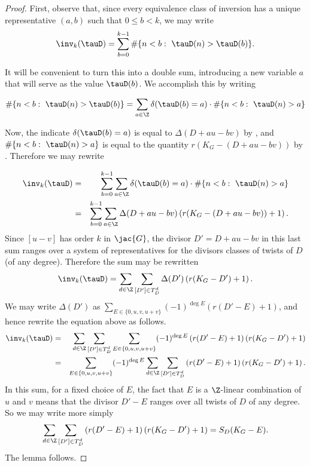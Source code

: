 \begin{proof}
First, observe that, since every equivalence class of inversion has a unique representative $(a,b)$ such that $0 \leq b < k$,  we may write
$$
\inv_k(\tauD)
=
\sum_{b=0}^{k-1} \# \{ n < b:\ \tauD(n) > \tauD(b) \}.
$$

It will be convenient to turn this into a double sum, introducing a new variable $a$ that will serve as the value $\tauD(b)$. We accomplish this by writing

\[ \# \{ n < b:\ \tauD(n) > \tauD(b) \} 
= \sum_{a \in \Z} \delta(\tauD(b) = a) \cdot \# \{n < b:\ \tauD(n) > a\}
\]

Now, the indicate $\delta(\tauD(b) = a)$ is equal to $\Delta( D + au-bv)$ by , and $\# \{n < b:\ \tauD(n) > a\}$ is equal to the quantity $r(K_G - (D+au-bv))$ by . Therefore we may rewrite

\begin{eqnarray*}
\inv_k(\tauD) &=&
\sum_{b=0}^{k-1} \sum_{a \in \Z} \delta(\tauD(b) = a) \cdot \# \{n < b:\ \tauD(n) > a\}\\
&=& \sum_{b=0}^{k-1} \sum_{a \in \Z} \Delta(D + au - bv) \left( r(K_G-(D+au-bv)) + 1 \right).\\
\end{eqnarray*}
Since $[u-v]$ has order $k$ in $\jac{G}$, the divisor $D' = D + au - bv$ in this last sum ranges over a system of representatives for the divisors classes of twists of $D$ (of any degree). Therefore the sum may be rewritten
$$
\inv_k(\tauD) = \sum_{d \in \Z} \sum_{[D'] \in T^d_D} \Delta( D') \left( r(K_G-D') + 1 \right).
$$
We may write $\Delta(D')$ as 
$\displaystyle \sum_{E \in \{0,u,v,u+v\}} (-1)^{\deg E} \left( r(D' - E) + 1 \right)$, and hence rewrite the equation above as follows.
\begin{eqnarray*}
\inv_k(\tauD) &=& \sum_{d \in \Z} \sum_{[D'] \in T^d_D} \sum_{E \in \{0,u,v,u+v\}} (-1)^{\deg E} \left( r(D'-E) + 1 \right) \left( r(K_G-D') + 1 \right)\\
&=& \sum_{E \in \{0,u,v,u+v\}} (-1)^{\deg E} \sum_{d \in \Z} \sum_{[D'] \in T^d_D} \left( r(D'-E) + 1 \right) \left( r(K_G-D') + 1 \right).
\end{eqnarray*}
In this sum, for a fixed choice of $E$, the fact that $E$ is a $\Z$-linear combination of $u$ and $v$ means that the divisor $D' - E$ ranges over all twists of $D$ of any degree. So we may write more simply 
$$
\sum_{d \in \Z} \sum_{[D'] \in T^d_D} \left( r(D'-E) + 1 \right) \left( r(K_G-D') + 1 \right) = S_D(K_G - E).
$$
The lemma follows.
\end{proof}

